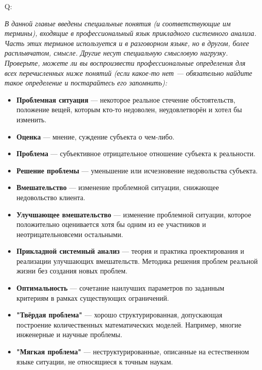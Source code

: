 \documentclass{article}
\newcommand{\define}[2]{
	\textbf{#1} --- #2
	}
\newcommand{\question}[2]{
	\begin{flushright}
		Q:\hspace{2ex}\vline\hspace{2ex}
		\begin{minipage}{0.9\textwidth}
			\large
			\textit{#1}
		\end{minipage}
	\end{flushright}
	\begin{center}
		\begin{minipage}{0.95\textwidth}
			#2
		\end{minipage}
	\end{center}
	}
\begin{document}
\question{В данной главые введены специальные понятия (и соответствующие им термины), входящие в профессиональный язык прикладного системного анализа. Часть этих терминов используется и в разговорном языке, но в другом, более расплывчатом, смысле. Другие несут специальную смысловую нагрузку. Проверьте, можете ли вы воспроизвести профессиональные определения для всех перечисленных ниже понятий (если какое-то нет --- обязательно найдите такое определение и постарайтесь его запомнить):}{
\begin{itemize}
	\item \define{Проблемная ситуация}{некоторое реальное стечение обстоятельств, положение вещей, которым кто-то недоволен, неудовлетворён и хотел бы изменить.}
	\item \define{Оценка}{мнение, суждение субъекта о чем-либо.}
	\item \define{Проблема}{субъективное отрицательное отношение субъекта к реальности.}
	\item \define{Решение проблемы}{уменьшение или исчезновение недовольства субъекта.}
	\item \define{Вмешательство}{изменение проблемной ситуации, снижающее недовольство клиента.}
	\item \define{Улучшающее вмешательство}{изменение проблемной ситуации, которое положительно оценивается хотя бы одним из ее участников и неотрицательно{всеми остальными.}
	\item \define{Прикладной системный анализ}{теория и практика проектирования и реализации улучшающих вмешательств.} Методика решения проблем реальной жизни без создания новых проблем.}
	\item \define{Оптимальность}{сочетание наилучших параметров по заданным критериям в рамках существующих ограничений.}
	\item \define{"Твёрдая проблема"}{хорошо структурированная, допускающая построение количественных математических моделей. Например, многие инженерные и научные проблемы.}
	\item \define{"Мягкая проблема"}{неструктурированные, описанные на естественном языке ситуации, не относящиеся к точным наукам.}
\end{itemize}}
\end{document}
